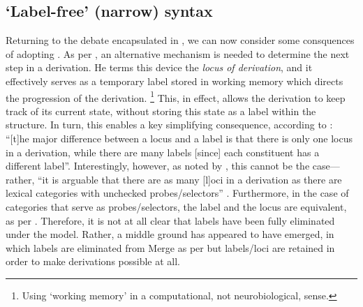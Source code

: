 \subsection{`Label-free' (narrow) syntax}\label{sec:260}

Returning to the debate encapsulated in , we can now consider some consquences of adopting . As per \textcite{CollinsC_2002}, an alternative mechanism is needed to determine the next step in a derivation. He terms this device the \textit{locus of derivation}, and it effectively serves as a temporary label stored in working memory which directs the progression of the derivation.%
\footnote{Using `working memory' in a computational, not neurobiological, sense.}
This, in effect, allows the derivation to keep track of its current state, without storing this state as a label within the structure. In turn, this enables a key simplifying consequence, according to \textcite[48]{CollinsC_2002}: ``[t]he major difference between a locus and a label is that there is only one locus in a derivation, while there are many labels [since] each constituent has a different label''. Interestingly, however, as noted by \textcite{SeelyTD_2006}, this cannot be the case---rather, ``it is arguable that there are as many [l]oci in a derivation as there are lexical categories with unchecked probes/selectors'' \parencite[213]{SeelyTD_2006}. Furthermore, in the case of categories that serve as probes/selectors, the label and the locus are equivalent, as per \textcite{CollinsC_2002}. Therefore, it is not at all clear that labels have been fully eliminated under the \textcite{CollinsC_2002} model. Rather, a middle ground has appeared to have emerged, in which labels are eliminated from Merge as per  but labels/loci are retained in order to make derivations possible at all.


